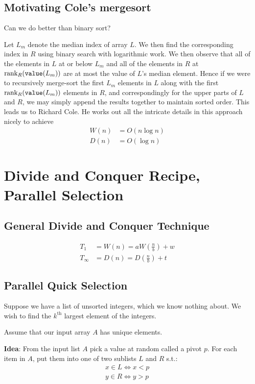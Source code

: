 \documentclass[11pt]{article}
\begin{document}
\subsection{Motivating Cole's mergesort}
\label{sec:org88b764b}
Can we do better than binary sort?

Let \(L_m\) denote the median index of array \(L\). We then find the corresponding index
in \(R\) using binary search with logarithmic work. We then observe that all of the elements
in \(L\) at or below \(L_m\) and all of the elements in \(R\)
at \(\text{rank}_R(\texttt{value}(L_m))\) are at most the value of \(L\)'s median element. Hence if we
were to recursively merge-sort the first \(L_m\) elements in \(L\) along with the
first \(\text{rank}_R(\texttt{value}(L_m))\) elements in \(R\), and correspondingly for the upper
parts of \(L\) and \(R\), we may simply append the results together to maintain sorted order.
This leads us to Richard Cole\cite{doi:10.1137/0217049}. He works out all the intricate details
in this approach nicely to achieve
\begin{align*}
W(n)&=O(n\log n)\\
D(n)&=O(\log n)
\end{align*}
\section{Divide and Conquer Recipe, Parallel Selection}
\label{sec:orgb1ee5c3}
\subsection{General Divide and Conquer Technique}
\label{sec:org3019df4}
\begin{align*}
T_1&=W(n)=aW(\frac{n}{b})+w\\
T_\infty&=D(n)=D(\frac{n}{b})+t
\end{align*}
\subsection{Parallel Quick Selection}
\label{sec:org067af93}
Suppose we have a list of unsorted integers, which we know nothing about. We wish to find
the \(k^{\text{th}}\) largest element of the integers.

Assume that our input array \(A\) has unique elements.

\textbf{Idea}: From the input list \(A\) pick a value at random called a pivot \(p\). For each item
in \(A\), put them into one of two sublists \(L\) and \(R\) s.t.:
\begin{gather*}
x\in L\Leftrightarrow x<p\\
y\in R\Leftrightarrow y>p
\end{gather*}
\end{document}
